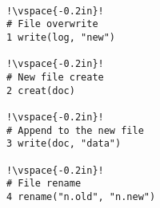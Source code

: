 \begin{lstlisting}[float=t, caption = {\textbf{Example application.}
\textit{\footnotesize The
listing shows the update protocol for an imaginary application.
}}, label = {lst-example}, escapechar=!]

!\vspace{-0.2in}!
# File overwrite
1 write(log, "new") 

!\vspace{-0.2in}!
# New file create 
2 creat(doc)

!\vspace{-0.2in}!
# Append to the new file
3 write(doc, "data")

!\vspace{-0.2in}!
# File rename
4 rename("n.old", "n.new")

\end{lstlisting}

